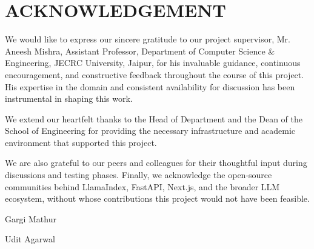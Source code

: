 \setcounter{page}{3}
\thispagestyle{plain}

\chapter*{ACKNOWLEDGEMENT}

\noindent We would like to express our sincere gratitude to our project supervisor, Mr. Aneesh Mishra, Assistant Professor, Department of Computer Science \& Engineering, JECRC University, Jaipur, for his invaluable guidance, continuous encouragement, and constructive feedback throughout the course of this project. His expertise in the domain and consistent availability for discussion has been instrumental in shaping this work.

\noindent We extend our heartfelt thanks to the Head of Department and the Dean of the School of Engineering for providing the necessary infrastructure and academic environment that supported this project.

\noindent We are also grateful to our peers and colleagues for their thoughtful input during discussions and testing phases. Finally, we acknowledge the open-source communities behind LlamaIndex, FastAPI, Next.js, and the broader LLM ecosystem, without whose contributions this project would not have been feasible.

\vspace{2cm}
\noindent Gargi Mathur

\noindent Udit Agarwal
